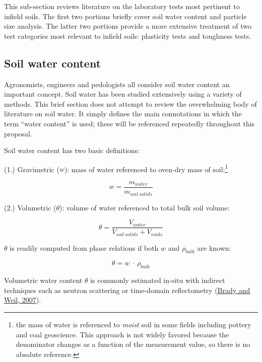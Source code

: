 \documentclass[
  letterpaper,
  openany]{book}
\begin{document}
This sub-section reviews literature on the laboratory tests most pertinent to infield soils.
The first two portions briefly cover soil water content and particle size analysis.
The latter two portions provide a more extensive treatment of two test categories most relevant to infield soils: plasticity tests and toughness tests.

\hypertarget{soil-water-content}{%
\subsection{Soil water content}\label{soil-water-content}}

Agronomists, engineers and pedologists all consider soil water content an important concept.
Soil water has been studied extensively using a variety of methods.
This brief section does not attempt to review the overwhelming body of literature on soil water.
It simply defines the main connotations in which the term ``water content'' is used; these will be referenced repeatedly throughout this proposal.

Soil water content has two basic definitions:

(1.) Gravimetric (\(w\)): mass of water referenced to oven-dry mass of soil:\footnote{the mass of water is referenced to \emph{moist} soil in some fields including pottery and coal geoscience. This approach is not widely favored because the denominator changes as a function of the measurement value, so there is no absolute reference.}

\begin{equation}
w = \frac{m_{water}}{m_{soil~solids}}
\label{eq:gravimetric-water-content}
\end{equation}

(2.) Volumetric (\(\theta\)): volume of water referenced to total bulk soil volume:

\begin{equation}
\theta = \frac{V_{water}}{V_{soil~solids}+V_{voids}}
\label{eq:volumetric-water-content}
\end{equation}

\(\theta\) is readily computed from phase relations if both \(w\) and \(\rho_{bulk}\) are known:

\begin{equation}
\theta=w~\cdot~\rho_{bulk}
\label{eq:theta-from-rho-and-w}
\end{equation}

Volumetric water content \(\theta\) is commonly estimated in-situ with indirect techniques such as neutron scattering or time-domain reflectometry (\protect\hyperlink{ref-Brady2007}{Brady and Weil, 2007}).
\end{document}
